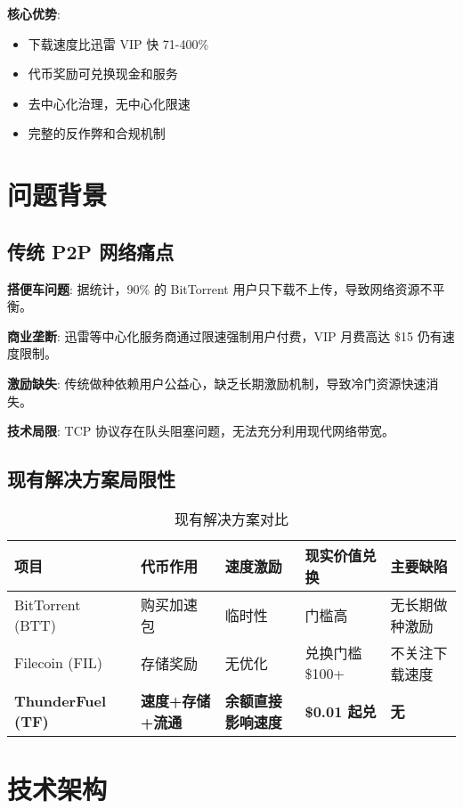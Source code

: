 \documentclass[12pt,a4paper]{article}
\begin{document}
\textbf{核心优势}:
\begin{itemize}
    \item 下载速度比迅雷 VIP 快 71-400\%
    \item 代币奖励可兑换现金和服务
    \item 去中心化治理，无中心化限速
    \item 完整的反作弊和合规机制
\end{itemize}

\section{问题背景}

\subsection{传统 P2P 网络痛点}

\textbf{搭便车问题}: 据统计，90\% 的 BitTorrent 用户只下载不上传，导致网络资源不平衡。

\textbf{商业垄断}: 迅雷等中心化服务商通过限速强制用户付费，VIP 月费高达 \$15 仍有速度限制。

\textbf{激励缺失}: 传统做种依赖用户公益心，缺乏长期激励机制，导致冷门资源快速消失。

\textbf{技术局限}: TCP 协议存在队头阻塞问题，无法充分利用现代网络带宽。

\subsection{现有解决方案局限性}

\begin{table}[h]
\centering
\begin{tabular}{|l|l|l|l|l|}
\hline
\textbf{项目} & \textbf{代币作用} & \textbf{速度激励} & \textbf{现实价值兑换} & \textbf{主要缺陷} \\
\hline
BitTorrent (BTT) & 购买加速包 & 临时性 & 门槛高 & 无长期做种激励 \\
\hline
Filecoin (FIL) & 存储奖励 & 无优化 & 兑换门槛 \$100+ & 不关注下载速度 \\
\hline
\textbf{ThunderFuel (TF)} & \textbf{速度+存储+流通} & \textbf{余额直接影响速度} & \textbf{\$0.01 起兑} & \textbf{无} \\
\hline
\end{tabular}
\caption{现有解决方案对比}
\end{table}

\section{技术架构}
\end{document}
